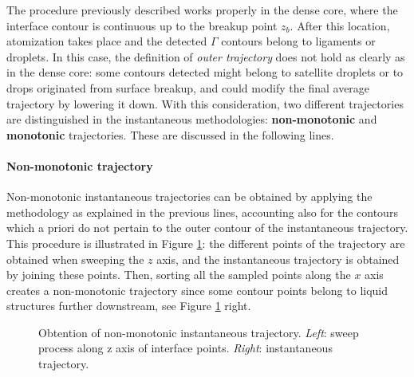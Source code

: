 The procedure previously described works properly in the dense core, where the interface contour is continuous up to the breakup point $z_b$. After this location, atomization takes place and the detected $\Gamma$ contours belong to ligaments or droplets. In this case, the definition of \textsl{outer trajectory} does not hold as clearly as in the dense core: some contours detected might belong to satellite droplets or to drops originated from surface breakup, and could modify the final average trajectory by lowering it down. With this consideration, two different trajectories are distinguished in the instantaneous methodologies: \textbf{non-monotonic} and \textbf{monotonic} trajectories. These are discussed in the following lines.


\paragraph*{{Non-monotonic trajectory}} 

Non-monotonic instantaneous trajectories can be obtained by applying the methodology as explained in the previous lines, accounting also for the contours which a priori do not pertain to the outer contour of the instantaneous trajectory. This procedure is illustrated in Figure \ref{fig:trajectory_obtention_instantaneous_method_a}: the different points of the trajectory are obtained when sweeping the $z$ axis, and the instantaneous trajectory is obtained by joining these points. Then, sorting all the sampled points along the $x$ axis creates a non-monotonic trajectory since some contour points belong to liquid structures further downstream, see Figure \ref{fig:trajectory_obtention_instantaneous_method_a} right.

\begin{figure}[ht]
     \centering
     \begin{subfigure}[b]{0.45\textwidth}
         \centering
     \end{subfigure}
     \begin{subfigure}[b]{0.45\textwidth}
         \centering
     \end{subfigure}
        \caption[Obtention of non-monotonic instantaneous trajectory]{Obtention of non-monotonic instantaneous trajectory. \textsl{Left}: sweep process along z axis of interface points. \textsl{Right}: instantaneous trajectory.}
        \label{fig:trajectory_obtention_instantaneous_method_a}
\end{figure}


